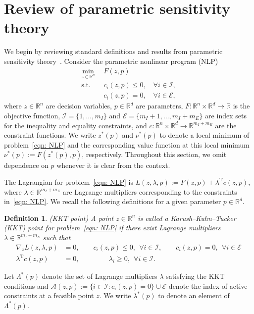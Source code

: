 \documentclass{article}
\newcommand{\tr}[1]{\ensuremath{{#1}^\text{T}}}
\newcommand{\A}{\mathcal{A}}
\newcommand{\E}{\mathcal{E}}
\newcommand{\I}{\mathcal{I}}
\newcommand{\R}{\mathbb{R}}
\newcommand{\1}[1]{\mathds{1}\left[#1\right]}
\newtheorem{definition}{Definition}
\begin{document}
\section{Review of parametric sensitivity theory}
\label{sec:sensitivity_theory}

We begin by reviewing standard definitions and results from parametric sensitivity theory~\cite{fiacco1983,still2018lectures}.
Consider the parametric nonlinear program (NLP)
\begin{align}
\label{eqn: NLP}
    \min_{z \in \R^n}\:\: &F(z,p) \\
    \text{s.t. } & c_i(z,p) \le 0, \quad \forall i \in \I, \nonumber \\
    & c_i(z,p) = 0, \quad \forall i \in \E, \nonumber
\end{align}
where $z\in\mathbb{R}^{n}$ are decision variables, $p\in\mathbb{R}^{d}$ are parameters, $F: \mathbb{R}^{n}\times\mathbb{R}^{d} \rightarrow \mathbb{R}$ is the objective function, $\I = \{1,\dots,m_I\}$ and $\E = \{m_I+1,\dots,m_I + m_E\}$ are index sets for the inequality and equality constraints, and $c:\mathbb{R}^{n}\times\mathbb{R}^{d} \rightarrow \mathbb{R}^{m_I + m_E}$ are the constraint functions.
We write $z^*(p)$ and $\nu^*(p)$ to denote a local minimum of problem~\eqref{eqn: NLP} and the corresponding value function at this local minimum $\nu^*(p) := F(z^*(p),p)$, respectively.
Throughout this section, we omit dependence on $p$ whenever it is clear from the context.

The Lagrangian for problem~\eqref{eqn: NLP} is $L(z,\lambda,p) := F(z,p) + \tr{\lambda} c(z,p)$, where $\lambda \in \R^{m_I + m_E}$ are Lagrange multipliers corresponding to the constraints in~\eqref{eqn: NLP}. 
We recall the following definitions for a given parameter $p \in \R^d$.


\begin{definition}{(KKT point)}
A point $z \in \R^{n}$ is called a Karush–Kuhn–Tucker (KKT) point for problem~\eqref{eqn: NLP} if there exist Lagrange multipliers $\lambda \in \R^{m_I + m_E}$ such that 
\begin{align*}
    \nabla_z L(z,\lambda,p) &= 0, \qquad c_i(z,p) \leq 0, \:\: \forall i \in \I, \qquad c_i(z,p) = 0, \:\: \forall i \in \E \\
     \tr{\lambda} c(z,p) &= 0, \qquad\qquad\: \lambda_i \geq 0, \:\: \forall i \in \I.
\end{align*}
\end{definition}


Let $\Lambda^*(p)$ denote the set of Lagrange multipliers $\lambda$ satisfying the KKT conditions and $\A(z,p) := \{i \in \I : c_i(z,p) = 0\} \cup \E$ denote the index of active constraints at a feasible point $z$.
We write $\lambda^*(p)$ to denote an element of $\Lambda^*(p)$.
\end{document}
